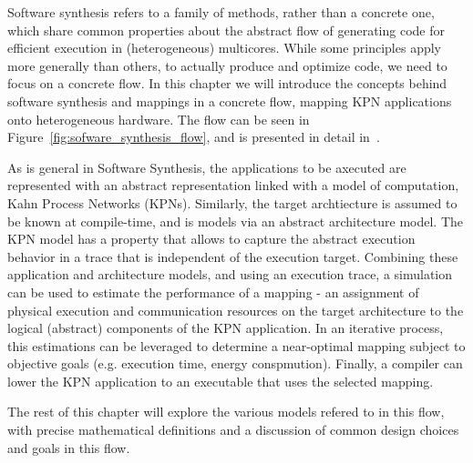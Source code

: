 %

Software synthesis refers to a family of methods, rather than a concrete one, which share common properties about the abstract flow of generating code for efficient execution in (heterogeneous) multicores. While some principles apply more generally than others, to actually produce and optimize code, we need to focus on a concrete flow. In this chapter we will introduce the concepts behind software synthesis and mappings in a concrete flow, mapping KPN applications onto heterogeneous hardware. The flow can be seen in Figure~\ref{fig:sofware_synthesis_flow}, and is presented in detail in~\cite{castrillon_phd}. 

As is general in Software Synthesis, the applications to be axecuted are represented with an abstract representation linked with a model of computation, Kahn Process Networks (KPNs). Similarly, the target archtiecture is assumed to be known at compile-time, and is models via an abstract architecture model. The KPN model has a property that allows to capture the abstract execution behavior in a trace that is independent of the execution target. Combining these application and architecture models, and using an execution trace, a simulation can be used to estimate the performance of a mapping - an assignment of physical execution and communication resources on the target architecture to the logical (abstract) components of the KPN application. In an iterative process, this estimations can be leveraged to determine a near-optimal mapping subject to objective goals (e.g. execution time, energy conspmution). Finally, a compiler can lower the KPN application to an executable that uses the selected mapping.

The rest of this chapter will explore the various models refered to in this flow, with precise mathematical definitions and a discussion of common design choices and goals in this flow.
